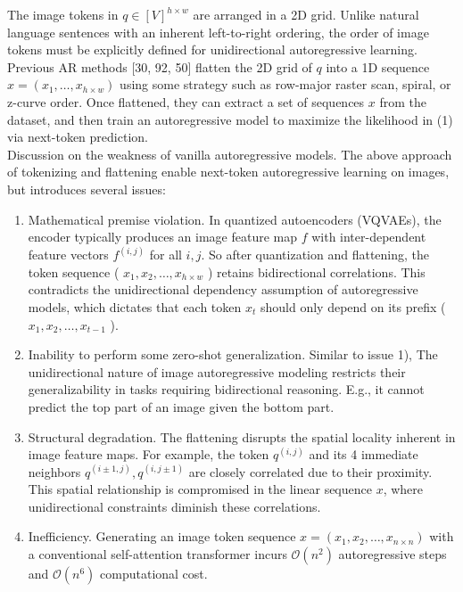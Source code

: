 \documentclass{article}
\begin{document}
The image tokens in $q \in[V]^{h \times w}$ are arranged in a 2D grid. Unlike natural language sentences with an inherent left-to-right ordering, the order of image tokens must be explicitly defined for unidirectional autoregressive learning. Previous AR methods [30, 92, 50] flatten the 2D grid of $q$ into a 1D sequence $x=\left(x_{1}, \ldots, x_{h \times w}\right)$ using some strategy such as row-major raster scan, spiral, or z-curve order. Once flattened, they can extract a set of sequences $x$ from the dataset, and then train an autoregressive model to maximize the likelihood in (1) via next-token prediction.\\
Discussion on the weakness of vanilla autoregressive models. The above approach of tokenizing and flattening enable next-token autoregressive learning on images, but introduces several issues:

\begin{enumerate}
  \item Mathematical premise violation. In quantized autoencoders (VQVAEs), the encoder typically produces an image feature map $f$ with inter-dependent feature vectors $f^{(i, j)}$ for all $i, j$. So after quantization and flattening, the token sequence ( $x_{1}, x_{2}, \ldots, x_{h \times w}$ ) retains bidirectional correlations. This contradicts the unidirectional dependency assumption of autoregressive models, which dictates that each token $x_{t}$ should only depend on its prefix ( $x_{1}, x_{2}, \ldots, x_{t-1}$ ).
  \item Inability to perform some zero-shot generalization. Similar to issue 1), The unidirectional nature of image autoregressive modeling restricts their generalizability in tasks requiring bidirectional reasoning. E.g., it cannot predict the top part of an image given the bottom part.
  \item Structural degradation. The flattening disrupts the spatial locality inherent in image feature maps. For example, the token $q^{(i, j)}$ and its 4 immediate neighbors $q^{(i \pm 1, j)}, q^{(i, j \pm 1)}$ are closely correlated due to their proximity. This spatial relationship is compromised in the linear sequence $x$, where unidirectional constraints diminish these correlations.
  \item Inefficiency. Generating an image token sequence $x=\left(x_{1}, x_{2}, \ldots, x_{n \times n}\right)$ with a conventional self-attention transformer incurs $\mathcal{O}\left(n^{2}\right)$ autoregressive steps and $\mathcal{O}\left(n^{6}\right)$ computational cost.
\end{enumerate}
\end{document}
